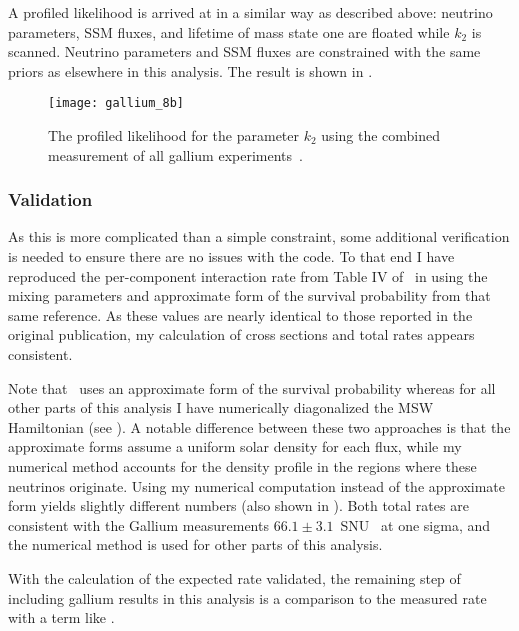 A profiled likelihood is arrived at in a similar way as described above: neutrino parameters, SSM fluxes, and lifetime of mass state one are floated while $k_2$ is scanned. 
Neutrino parameters and SSM fluxes are constrained with the same priors as elsewhere in this analysis.
The result is shown in .

\begin{figure}
\centering
\texttt{[image: gallium\_8b]}
\caption{The profiled likelihood for the parameter $k_2$ using the combined measurement of all gallium experiments~\cite{sagecombo}.}
\label{fig:ga_profiles}
\end{figure}

\subsubsection{Validation}

As this is more complicated than a simple constraint, some additional verification is needed to ensure there are no issues with the code.
To that end I have reproduced the per-component interaction rate from Table IV of~\cite{sagecombo} in  using the mixing parameters and approximate form of the survival probability from that same reference.
As these values are nearly identical to those reported in the original publication, my calculation of cross sections and total rates appears consistent.

Note that~\cite{sagecombo} uses an approximate form of the survival probability whereas for all other parts of this analysis I have numerically diagonalized the MSW Hamiltonian (see ).
A notable difference between these two approaches is that the approximate forms assume a uniform solar density for each flux, while my numerical method accounts for the density profile in the regions where these neutrinos originate.
Using my numerical computation instead of the approximate form yields slightly different numbers (also shown in ). 
Both total rates are consistent with the Gallium measurements $66.1\pm3.1$~SNU~\cite{sagecombo} at one sigma, and the numerical method is used for other parts of this analysis.

With the calculation of the expected rate validated, the remaining step of including gallium results in this analysis is a comparison to the measured rate with a term like .

